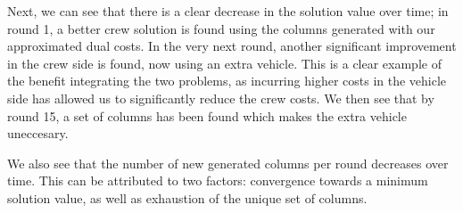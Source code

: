 \documentclass[]{article}
\begin{document}
Next, we can see that there is a clear decrease in the solution value over time; in round 1, a better crew solution is found using the columns generated with our approximated dual costs. In the very next round, another significant improvement in the crew side is found, now using an extra vehicle. This is a clear example of the benefit integrating the two problems, as incurring higher costs in the vehicle side has allowed us to significantly reduce the crew costs. We then see that by round 15, a set of columns has been found which makes the extra vehicle uneccesary. 

We also see that the number of new generated columns per round decreases over time. This can be attributed to two factors: convergence towards a minimum solution value, as well as exhaustion of the unique set of columns. \\
\end{document}

